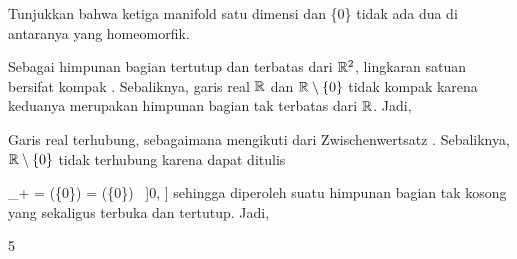 {

Tunjukkan bahwa ketiga manifold satu dimensi
 {} {\R} {dan} {\R \setminus \{0\}} {}
tidak ada dua di antaranya yang homeomorfik.

}
{

Sebagai himpunan bagian tertutup dan terbatas dari ${\mathbb R}^2$, lingkaran satuan bersifat kompak
 {} {.} Sebaliknya, garis real ${\mathbb R}$ dan ${\mathbb R} \setminus \{0\}$ tidak kompak karena keduanya merupakan himpunan bagian tak terbatas dari ${\mathbb R}$. Jadi,

Garis real terhubung, sebagaimana mengikuti dari
Zwischenwertsatz
. Sebaliknya, ${\mathbb R} \setminus \{0\}$ tidak terhubung karena dapat ditulis

\mavergleichskettedisp
{\vergleichskette
{\R_+
}
{ =} {(\R \setminus \{0\}) \cap [0, \infty]
}
{ =} {(\R \setminus \{0\}) \cap \, ]0, \infty]
}
{ } {
}
{ } {
}
}
{}{}{}
sehingga diperoleh suatu himpunan bagian tak kosong yang sekaligus terbuka dan tertutup. Jadi,

 }



{5}

